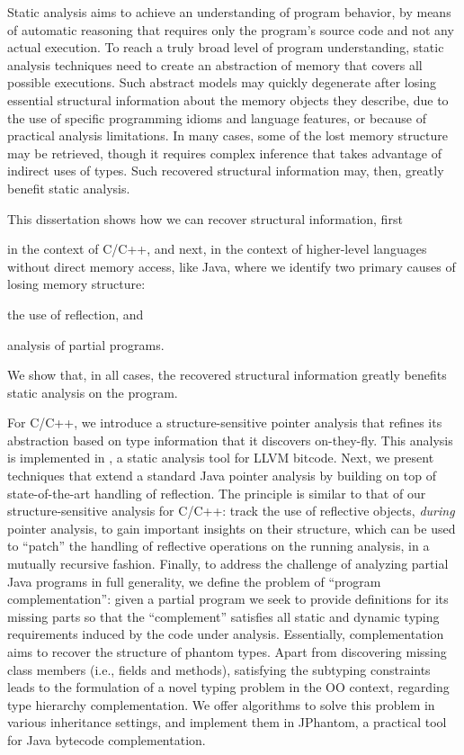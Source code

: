 
Static analysis aims to achieve an understanding of program behavior,
by means of automatic reasoning that requires only the program's
source code and not any actual execution. To reach a truly broad level
of program understanding, static analysis techniques need to create an
abstraction of memory that covers all possible executions. Such
abstract models may quickly degenerate after losing essential
structural information about the memory objects they describe, due to
the use of specific programming idioms and language features, or
because of practical analysis limitations. In many cases, some of the
lost memory structure may be retrieved, though it requires complex
inference that takes advantage of indirect uses of types. Such
recovered structural information may, then, greatly benefit static
analysis.

This dissertation shows how we can recover structural information,
first
\begin{inparaenum}[(i)]
\item in the context of C/C++, and next, in the context of
  higher-level languages without direct memory access, like Java,
  where we identify two primary causes of losing memory structure:
\item the use of reflection, and
\item analysis of partial programs.
\end{inparaenum}
We show that, in all cases, the recovered structural information
greatly benefits static analysis on the program.

For C/C++, we introduce a structure-sensitive pointer analysis that
refines its abstraction based on type information that it discovers
on-they-fly. This analysis is implemented in \cclyzer{}, a static
analysis tool for LLVM bitcode.
%
Next, we present techniques that extend a standard Java pointer
analysis by building on top of state-of-the-art handling of
reflection. The principle is similar to that of our
structure-sensitive analysis for C/C++: track the use of reflective
objects, \emph{during} pointer analysis, to gain important insights on
their structure, which can be used to ``patch'' the handling of
reflective operations on the running analysis, in a mutually recursive
fashion.
%
Finally, to address the challenge of analyzing partial Java programs
in full generality, we define the problem of ``program
complementation'': given a partial program we seek to provide
definitions for its missing parts so that the ``complement'' satisfies
all static and dynamic typing requirements induced by the code under
analysis. Essentially, complementation aims to recover the structure
of phantom types.  Apart from discovering missing class members (i.e.,
fields and methods), satisfying the subtyping constraints leads to the
formulation of a novel typing problem in the OO context, regarding
type hierarchy complementation. We offer algorithms to solve this
problem in various inheritance settings, and implement them in
JPhantom, a practical tool for Java bytecode complementation.


